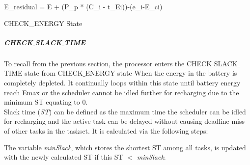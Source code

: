 \documentclass[12pt,hidelinks]{article}
\begin{document}
{\begin{algorithm}[H]
  
    
      { E_{residual} = E + (P_p * (C_i - t_{Ei}))-(e_{i}-E_{ci})\\}
    

\caption{CHECK\_ENERGY State}
\end{algorithm}

\subparagraph{CHECK$\_$SLACK$\_$TIME}\hfill \label{SlackMethodTime}
\newline

To recall from the previous section, the processor enters the CHECK$\_$SLACK$\_$TIME state from CHECK$\_$ENERGY state When the energy in the battery is completely depleted. It continually loops within this state until battery energy reach Emax or the scheduler cannot be idled further for recharging due to the minimum ST equating to 0.\\

Slack time (\textit{ST}) can be defined as the maximum time the scheduler can be idled for recharging and the active task can be delayed without causing deadline miss of other tasks in the taskset. It is calculated via the following steps: \newline


The variable \textit{minSlack}, which stores the shortest ST among all tasks, is updated with the newly calculated ST if this ST $<$ \textit{minSlack}.\\

}
\end{document}
